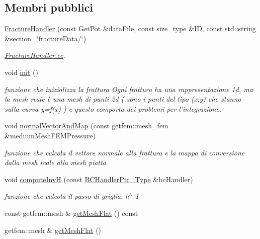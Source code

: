 \subsection*{Membri pubblici}
\begin{DoxyCompactItemize}
\item 
\hyperlink{classFractureHandler_aa3872456d95550cdd424908bbb5a15ec}{Fracture\-Handler} (const Get\-Pot \&data\-File, const size\-\_\-type \&I\-D, const std\-::string \&section=\char`\"{}fracture\-Data/\char`\"{})
\begin{DoxyCompactList}\small\item\em \hyperlink{FractureHandler_8cc}{Fracture\-Handler.\-cc}. \end{DoxyCompactList}\item 
void \hyperlink{classFractureHandler_aa28ce054ba2a2679214956c71f8cf1e0}{init} ()
\begin{DoxyCompactList}\small\item\em funzione che inizializza la frattura Ogni frattura ha una rappresentazione 1d, ma la mesh reale è una mesh di punti 2d ( sono i punti del tipo (x,y) che stanno sulla curva y=f(x) ) e questo comporta dei problemi per l'integrazione. \end{DoxyCompactList}\item 
void \hyperlink{classFractureHandler_aec1fc4e2664b3fe60877b63024af3605}{normal\-Vector\-And\-Map} (const getfem\-::mesh\-\_\-fem \&medium\-Mesh\-F\-E\-M\-Pressure)
\begin{DoxyCompactList}\small\item\em funzione che calcola il vettore normale alla frattura e la mappa di conversione dalla mesh reale alla mesh piatta \end{DoxyCompactList}\item 
void \hyperlink{classFractureHandler_a87f0f8e2998b621b481173ec8d9aaa2a}{compute\-Inv\-H} (const \hyperlink{BCHandler_8h_aa175884cb453788647f17f2230a2a762}{B\-C\-Handler\-Ptr\-\_\-\-Type} \&bc\-Handler)
\begin{DoxyCompactList}\small\item\em funzione che calcola il passo di griglia, h$^\wedge$-\/1 \end{DoxyCompactList}\item 
const getfem\-::mesh \& \hyperlink{classFractureHandler_a9ff9f584b850d6b750981befdbefbdbe}{get\-Mesh\-Flat} () const 
\item 
getfem\-::mesh \& \hyperlink{classFractureHandler_ad9b02a825d444016b3ab8ee901f887f6}{get\-Mesh\-Flat} ()
\item 

\end{DoxyCompactItemize}
